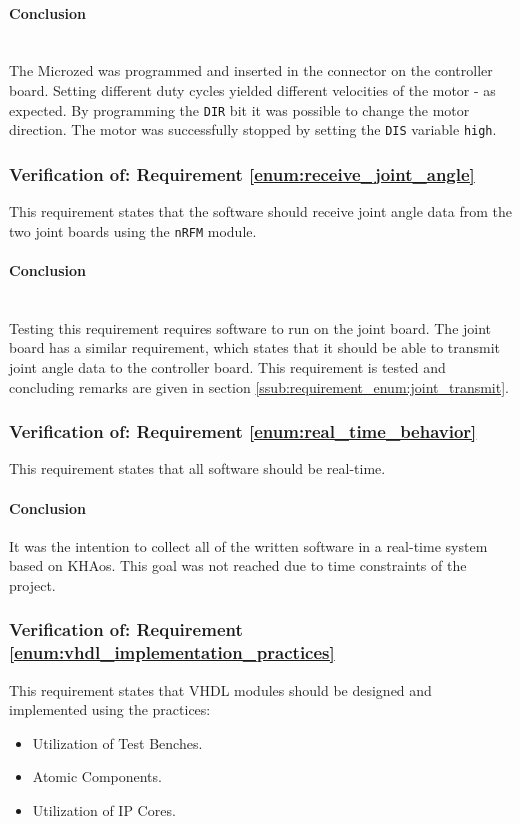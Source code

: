\paragraph{Conclusion}~\\
The Microzed was programmed and inserted in the connector on the controller board.
Setting different duty cycles yielded different velocities of the motor - as expected.
By programming the \texttt{DIR} bit it was possible to change the motor direction.
The motor was successfully stopped by setting the \texttt{DIS} variable \texttt{high}.

\subsubsection{Verification of: Requirement \ref{enum:receive_joint_angle}} %
\label{ssub:verificatation_of_requirement_enum:receive_joint_angle}
This requirement states that the software should receive joint angle data from the two joint boards using the \texttt{nRFM} module.

\paragraph{Conclusion}~\\
Testing this requirement requires software to run on the joint board.
The joint board has a similar requirement, which states that it should be able to transmit joint angle data to the controller board.
This requirement is tested and concluding remarks are given in section \ref{ssub:requirement_enum:joint_transmit}.

\subsubsection{Verification of: Requirement \ref{enum:real_time_behavior}} %
\label{ssub:verification_of_requirement_of_requirement_enum:real_time_behavior}
This requirement states that all software should be real-time.
\paragraph{Conclusion}
It was the intention to collect all of the written software in a real-time system based on KHAos.
This goal was not reached due to time constraints of the project. 

\subsubsection{Verification of: Requirement \ref{enum:vhdl_implementation_practices}} %
\label{ssub:verification_of_requirement_enum:vhdl_implementation_practices}
This requirement states that VHDL modules should be designed and implemented using the practices:
\begin{itemize}
	\item Utilization of Test Benches.
	\item Atomic Components.
	\item Utilization of IP Cores.
\end{itemize}

